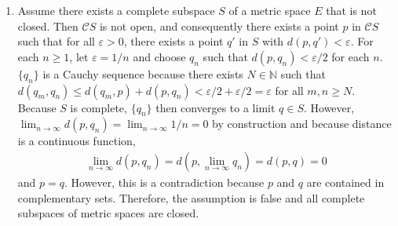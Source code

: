 \documentclass[a4paper,12pt]{article}
\begin{document}
\begin{enumerate}
\begin{enumerate}
                \item
                    \begin{enumerate}[label=(\roman*)]
                        \item
                            $\lVert(x_1, \cdots, x_n)\rVert = \max\{|x_1|, \cdots, |x_n|\} \geq 0$ since $|x_i| \geq 0 \; \forall i$
                        \item
                            ($\Rightarrow$) $\max\{|x_1|, \cdots, |x_n|\} = 0 \Rightarrow x_i = 0 \; \forall i \Rightarrow (x_1, \cdots, x_n) = 0$ \\
                            ($\Leftarrow$) $(x_1, \cdots, x_n) = 0 \Rightarrow |x_i| = 0 \; \forall i \Rightarrow \max\{|x_1|, \cdots, |x_n|\} = \\
                            \lVert(x_1, \cdots, x_n)\rVert = 0$
                        \item
                            $\lVert c(x_1, \cdots, x_n) \rVert = \lVert(cx_1, \cdots, cx_n)\rVert = \max\{|cx_1|, \cdots, |cx_n|\} \\
                            = \max\{|c||x_1|, \cdots, |c||x_n|\} = |c| \max\{|x_1|, \cdots, |x_n|\} = |c| \lVert(x_1, \cdots, x_n)\rVert$
                        \item
                            $\lVert (x_1, \cdots, x_n) + (y_1, \cdots, y_n) \rVert = \lVert (x_1 + y_1, \cdots, x_n + y_n) \rVert = \max\{|x_1 + y_1|, \cdots, |x_n + y_n|\} \leq \max\{|x_1| + |y_1|, \cdots, |x_n| + |y_n|\} \leq \max\{|x_1|, \cdots, |x_n|\} + \max\{|y_1|, \cdots, |y_n|\} = \lVert(x_1, \cdots, x_n)\rVert + \lVert(y_1, \cdots, y_n)\rVert$
                    \end{enumerate}
            \end{enumerate}

        \item[24)]
            Assume there exists a complete subspace $S$ of a metric space $E$ that is not closed. Then $\mathcal{C}S$ is not open, and consequently there exists a point $p$ in $\mathcal{C}S$ such that for all $\varepsilon > 0$, there exists a point $q'$ in $S$ with $d(p, q') < \varepsilon$. For each $n \geq 1$, let $\varepsilon = 1 / n$ and choose $q_n$ such that $d(p, q_n) < \varepsilon / 2$ for each $n$. $\{q_n\}$ is a Cauchy sequence because there exists $N \in \mathbb{N}$ such that $d(q_m, q_n) \leq d(q_m, p) + d(p, q_n) < \varepsilon / 2 + \varepsilon / 2 = \varepsilon$ for all $m, n \geq N$. Because $S$ is complete, $\{q_n\}$ then converges to a limit $q \in S$. However, $\lim_{n \to \infty} d(p, q_n) = \lim_{n \to \infty} 1 / n = 0$ by construction and because distance is a continuous function,
            \begin{align*}
                \lim_{n \to \infty} d(p, q_n) = d(p, \lim_{n \to \infty} q_n) = d(p, q) = 0
            \end{align*}
            and $p = q$. However, this is a contradiction because $p$ and $q$ are contained in complementary sets. Therefore, the assumption is false and all complete subspaces of metric spaces are closed.


\end{enumerate}
\end{document}
